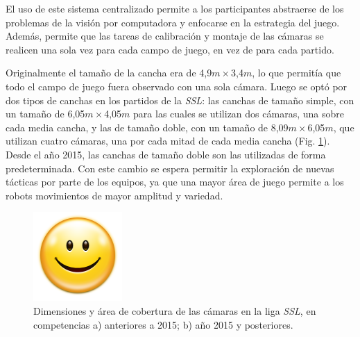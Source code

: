 El uso de este sistema centralizado permite a los participantes abstraerse de
los problemas de la visión por computadora y enfocarse en la estrategia del
juego. Además, permite que las tareas de calibración y montaje de las cámaras se
realicen una sola vez para cada campo de juego, en vez de para cada partido.

Originalmente el tamaño de la cancha era de 4,9$m\times$3,4$m$, lo que permitía
que todo el campo de juego fuera observado con una sola cámara. Luego se optó
por dos tipos de canchas en los partidos de la \emph{SSL}: las canchas de tamaño
simple, con un tamaño de 6,05$m\times$4,05$m$ para las cuales se utilizan dos
cámaras, una sobre cada media cancha, y las de tamaño doble, con un tamaño de
8,09$m\times$6,05$m$, que utilizan cuatro cámaras, una por cada mitad de cada
media cancha (Fig. \ref{FALTA}). Desde el año 2015, las canchas de tamaño doble
son las utilizadas de forma predeterminada\cite{sslrules2015}. Con este cambio
se espera permitir la exploración de nuevas tácticas por parte de los equipos,
ya que una mayor área de juego permite a los robots movimientos de mayor
amplitud y variedad.

\begin{figure}[!h]

	\includegraphics[width=\textwidth]{img/FALTA.png}

	\caption{Dimensiones y área de cobertura de las cámaras en la liga
	\emph{SSL}, en competencias a) anteriores a 2015; b) año 2015 y
	posteriores.}

	\label{FALTA}

\end{figure}

